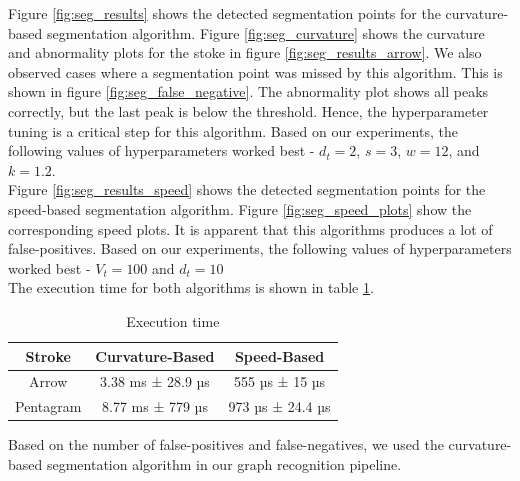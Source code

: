 Figure \ref{fig:seg_results} shows the detected segmentation points for the curvature-based segmentation algorithm. Figure \ref{fig:seg_curvature} shows the curvature and abnormality plots for the stoke in figure \ref{fig:seg_results_arrow}. We also observed cases where a segmentation point was missed by this algorithm. This is shown in figure \ref{fig:seg_false_negative}. The abnormality plot shows all peaks correctly, but the last peak is below the threshold. Hence, the hyperparameter tuning is a critical step for this algorithm. Based on our experiments, the following values of hyperparameters worked best - $d_t = 2$, $s = 3$, $w = 12$, and $k = 1.2$.\\

Figure \ref{fig:seg_results_speed} shows the detected segmentation points for the speed-based segmentation algorithm. Figure \ref{fig:seg_speed_plots} show the corresponding speed plots. It is apparent that this algorithms produces a lot of false-positives. Based on our experiments, the following values of hyperparameters worked best - $V_t = 100$ and $d_t = 10$\\

The execution time for both algorithms is shown in table \ref{table:exec_time}.

\begin{table}[h]
	\centering
	\begin{tabular}{|c|c|c|}
		\hline
		Stroke & Curvature-Based & Speed-Based\\
		\hline
		Arrow & 3.38 ms ± 28.9 µs & 555 µs ± 15 µs\\
		\hline
		Pentagram & 8.77 ms ± 779 µs & 973 µs ± 24.4 µs\\
		\hline
	\end{tabular}
	\caption{Execution time}
	\label{table:exec_time}
\end{table}

Based on the number of false-positives and false-negatives, we used the curvature-based segmentation algorithm in our graph recognition pipeline.